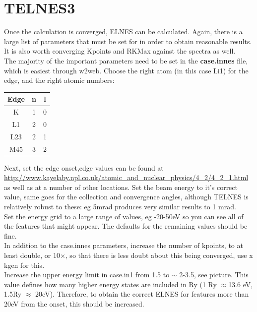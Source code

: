 \documentclass[12pt]{article}
\begin{document}
\section{TELNES3}

Once the calculation is converged, ELNES can be calculated.  Again, there is a large list of parameters that must be set for in order to obtain reasonable results. It is also worth converging Kpoints and RKMax against the spectra as well.\\
The majority of the important parameters need to be set in the \textbf{case.innes} file, which is easiest through w2web.  Choose the right atom (in this case Li1) for the edge, and the right atomic numbers:  

\begin{table}[H]
	\centering
	\begin{tabular}{ccc}
		
		Edge & n & l \\
		\hline
		K & 1 &0 \\
		L1 & 2 & 0 \\
		L23 & 2 &1\\
		M45 & 3 & 2\\
	\end{tabular}
	
\end{table}

Next, set the edge onset,edge values can be found at \url{http://www.kayelaby.npl.co.uk/atomic_and_nuclear_physics/4_2/4_2_1.html} as well as at a number of other locations.  Set the beam energy to it's correct value, same goes for the collection and convergence angles, although TELNES is relatively robust to these: eg 5mrad produces very similar results to 1 mrad.\\

Set the energy grid to a large range of values, eg -20-50eV so you can see all of the features that might appear.  The defaults for the remaining values should be fine.\\

In addition to the case.innes parameters, increase the number of kpoints, to at least double, or 10$\times$, so that there is less doubt about this being converged, use x kgen for this.  \\

Increase the upper energy limit in case.in1 from 1.5 to $\sim$ 2-3.5, see picture.  This value defines how many higher energy states are included in Ry (1 Ry $\approx$13.6 eV, 1.5Ry $\approx$ 20eV). Therefore, to obtain the correct ELNES for features more than 20eV from the onset,  this should be increased.  \\
\end{document}
